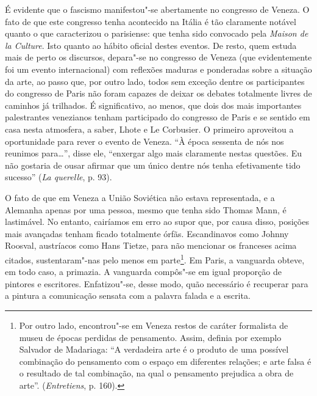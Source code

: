 É evidente que o fascismo manifestou"-se abertamente no congresso de
Veneza. O fato de que este congresso tenha acontecido na Itália é tão
claramente notável quanto o que caracterizou o parisiense: que tenha
sido convocado pela \emph{Maison de la Culture}. Isto quanto ao hábito
oficial destes eventos. De resto, quem estuda mais de perto os
discursos, depara"-se no congresso de Veneza (que evidentemente foi um
evento internacional) com reflexões maduras e ponderadas sobre a
situação da arte, ao passo que, por outro lado, todos sem exceção dentre
os participantes do congresso de Paris não foram capazes de deixar os
debates totalmente livres de caminhos já trilhados. É significativo, ao
menos, que dois dos mais importantes palestrantes venezianos tenham
participado do congresso de Paris e se sentido em casa nesta atmosfera,
a saber, Lhote e Le Corbusier. O primeiro aproveitou a oportunidade para
rever o evento de Veneza. ``À época sessenta de nós nos reunimos
para\ldots{}'', disse ele, ``enxergar algo mais claramente nestas questões.
Eu não gostaria de ousar afirmar que um único dentre nós tenha
efetivamente tido sucesso'' (\emph{La querelle}, p. 93).

O fato de que em Veneza a União Soviética não estava representada, e a
Alemanha apenas por uma pessoa, mesmo que tenha sido Thomas Mann, é
lastimável. No entanto, cairíamos em erro ao supor que, por causa disso,
posições mais avançadas tenham ficado totalmente órfãs. Escandinavos
como Johnny Roosval, austríacos como Hans Tietze, para não mencionar os
franceses acima citados, sustentaram"-nas pelo menos em parte\footnote{Por
  outro lado, encontrou"-se em Veneza restos de caráter formalista de
  museu de épocas perdidas de pensamento. Assim, definia por exemplo
  Salvador de Madariaga: ``A verdadeira arte é o produto de uma possível
  combinação do pensamento com o espaço em diferentes relações; e arte
  falsa é o resultado de tal combinação, na qual o pensamento prejudica
  a obra de arte''. (\emph{Entretiens}, p. 160).}. Em Paris, a vanguarda
obteve, em todo caso, a primazia. A vanguarda compôs"-se em igual
proporção de pintores e escritores. Enfatizou"-se, desse modo, quão
necessário é recuperar para a pintura a comunicação sensata com a
palavra falada e a escrita.

